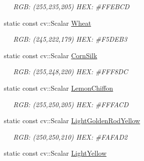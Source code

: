\begin{DoxyCompactItemize}
\begin{DoxyCompactList}\small\item\em ~~ R\+GB\+: (255,235,205) H\+EX\+: \#\+F\+F\+E\+B\+CD \end{DoxyCompactList}\item 
static const cv\+::\+Scalar \hyperlink{classcanvascv_1_1Colors_abdf1b5b05df103dd98f0ece1a6e3719e}{Wheat}\hypertarget{classcanvascv_1_1Colors_abdf1b5b05df103dd98f0ece1a6e3719e}{}\label{classcanvascv_1_1Colors_abdf1b5b05df103dd98f0ece1a6e3719e}

\begin{DoxyCompactList}\small\item\em ~~ R\+GB\+: (245,222,179) H\+EX\+: \#\+F5\+D\+E\+B3 \end{DoxyCompactList}\item 
static const cv\+::\+Scalar \hyperlink{classcanvascv_1_1Colors_ae3c14894ce951c52ae5ad0b8f7f57bfc}{Corn\+Silk}\hypertarget{classcanvascv_1_1Colors_ae3c14894ce951c52ae5ad0b8f7f57bfc}{}\label{classcanvascv_1_1Colors_ae3c14894ce951c52ae5ad0b8f7f57bfc}

\begin{DoxyCompactList}\small\item\em ~~ R\+GB\+: (255,248,220) H\+EX\+: \#\+F\+F\+F8\+DC \end{DoxyCompactList}\item 
static const cv\+::\+Scalar \hyperlink{classcanvascv_1_1Colors_ad04b3f94f885606d167a4e4c8480e97c}{Lemon\+Chiffon}\hypertarget{classcanvascv_1_1Colors_ad04b3f94f885606d167a4e4c8480e97c}{}\label{classcanvascv_1_1Colors_ad04b3f94f885606d167a4e4c8480e97c}

\begin{DoxyCompactList}\small\item\em ~~ R\+GB\+: (255,250,205) H\+EX\+: \#\+F\+F\+F\+A\+CD \end{DoxyCompactList}\item 
static const cv\+::\+Scalar \hyperlink{classcanvascv_1_1Colors_a8b2919184b567020ab06f3fb428773cf}{Light\+Golden\+Rod\+Yellow}\hypertarget{classcanvascv_1_1Colors_a8b2919184b567020ab06f3fb428773cf}{}\label{classcanvascv_1_1Colors_a8b2919184b567020ab06f3fb428773cf}

\begin{DoxyCompactList}\small\item\em ~~ R\+GB\+: (250,250,210) H\+EX\+: \#\+F\+A\+F\+A\+D2 \end{DoxyCompactList}\item 
static const cv\+::\+Scalar \hyperlink{classcanvascv_1_1Colors_a6e2b95c2ef4ca3e4d536670e2091e21a}{Light\+Yellow}\hypertarget{classcanvascv_1_1Colors_a6e2b95c2ef4ca3e4d536670e2091e21a}{}\label{classcanvascv_1_1Colors_a6e2b95c2ef4ca3e4d536670e2091e21a}


\end{DoxyCompactItemize}
